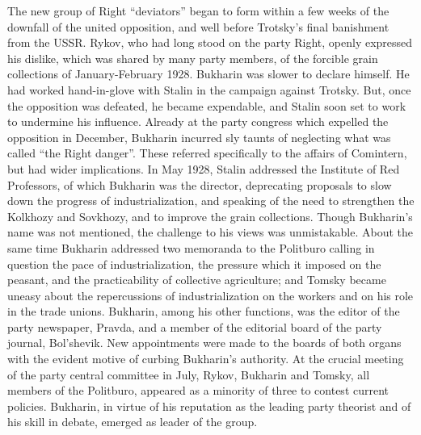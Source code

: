 The new group of Right ``deviators'' began to form within a few weeks of the downfall of the united opposition, and well before Trotsky's final banishment from the USSR. Rykov, who had long stood on the party Right, openly expressed his dislike, which was shared by many party members, of the forcible grain collections of January-February 1928. Bukharin was slower to declare himself. He had worked hand-in-glove with Stalin in the campaign against Trotsky. But, once the opposition was defeated, he became expendable, and Stalin soon set to work to undermine his influence. Already at the party congress which expelled the opposition in December, Bukharin incurred sly taunts of neglecting what was called ``the Right danger''. These referred specifically to the affairs of Comintern, but had wider implications. In May 1928, Stalin addressed the Institute of Red Professors, of which Bukharin was the director, deprecating proposals to slow down the progress of industrialization, and speaking of the need to strengthen the Kolkhozy and Sovkhozy, and to improve the grain collections. Though Bukharin's name was not mentioned, the challenge to his views was unmistakable. About the same time Bukharin addressed two memoranda to the Politburo calling in question the pace of industrialization, the pressure which it imposed on the peasant, and the practicability of collective agriculture; and Tomsky became uneasy about the repercussions of industrialization on the workers and on his role in the trade unions. Bukharin, among his other functions, was the editor of the party newspaper, Pravda, and a member of the editorial board of the party journal, Bol'shevik. New appointments were made to the boards of both organs with the evident motive of curbing Bukharin's authority. At the crucial meeting of the party central committee in July, Rykov, Bukharin and Tomsky, all members of the Politburo, appeared as a minority of three to contest current policies. Bukharin, in virtue of his reputation as the leading party theorist and of his skill in debate, emerged as leader of the group. 

